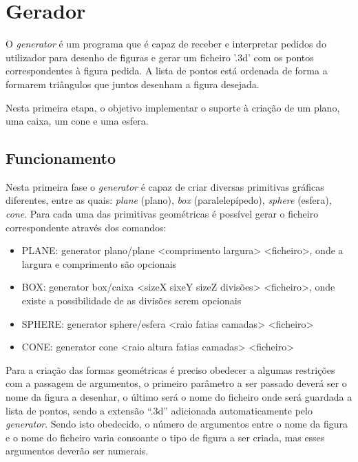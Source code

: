 \chapter{Gerador}
\label{cap:p1}


O \textit{generator} é um programa que é capaz de receber e interpretar pedidos do utilizador para desenho de figuras e gerar um ficheiro '.3d' com os pontos correspondentes à figura pedida. A lista de pontos está ordenada de forma a formarem triângulos que juntos desenham a figura desejada. 

Nesta primeira etapa, o objetivo implementar o suporte à criação de um plano, uma caixa, um cone e uma esfera. 


\section{Funcionamento}

Nesta primeira fase o \textit{generator} é capaz de criar diversas primitivas gráficas
diferentes, entre as quais: \textit{plane} (plano), \textit{box} (paralelepípedo), \textit{sphere} (esfera), \textit{cone}. Para cada uma das primitivas geométricas é possível gerar o ficheiro correspondente através dos comandos:

\begin{itemize}
	\item PLANE: generator plano/plane <comprimento largura> <ficheiro>, onde a largura e comprimento são opcionais 
	
	\item BOX: generator box/caixa <sizeX sixeY sizeZ divisões> <ficheiro>, onde existe a possibilidade de as divisões serem opcionais
	
	\item SPHERE: generator sphere/esfera <raio fatias camadas> <ficheiro>
	
	\item CONE: generator cone <raio altura fatias camadas> <ficheiro>
	
\end{itemize}


Para a criação das formas geométricas é preciso obedecer a algumas restrições
com a passagem de argumentos, o primeiro parâmetro a ser passado deverá
ser o nome da figura a desenhar, o último será o nome do ficheiro onde será
guardada a lista de pontos, sendo a extensão “.3d” adicionada automaticamente
pelo \textit{generator}. Sendo isto obedecido, o número de argumentos entre
o nome da figura e o nome do ficheiro varia consoante o tipo de figura a ser
criada, mas esses argumentos deverão ser numerais.

